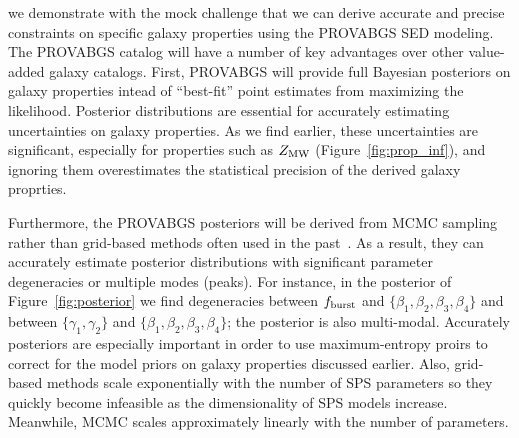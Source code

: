 
 we demonstrate with the mock challenge that we can derive
accurate and precise constraints on specific galaxy properties using the {\sc
PROVABGS} SED modeling. 
The {\sc PROVABGS} catalog will have a number of key advantages over other
value-added galaxy catalogs. 
First, {\sc PROVABGS} will provide full Bayesian posteriors on galaxy
properties intead of ``best-fit'' point estimates from maximizing the
likelihood. 
Posterior distributions are essential for accurately estimating uncertainties
on galaxy properties.  
As we find earlier, these uncertainties are significant, especially for
properties such as $Z_{\rm MW}$ (Figure~\ref{fig:prop_inf}), and ignoring them
overestimates the statistical precision of the derived galaxy proprties. 

Furthermore, the {\sc PROVABGS} posteriors will be derived from MCMC sampling
rather than grid-based methods often used in the
past~\citep[\emph{e.g.}][]{dacunha2008, moustakas2013, boquien2019}.
As a result, they can accurately estimate posterior distributions with
significant parameter degeneracies or multiple modes (peaks). 
For instance, in the posterior of Figure~\ref{fig:posterior} we find
degeneracies between $f_{\rm burst}$ and $\{\beta_1, \beta_2, \beta_3,
\beta_4\}$ and between $\{\gamma_1, \gamma_2\}$ and $\{\beta_1, \beta_2,
\beta_3, \beta_4\}$; the posterior is also multi-modal. 
Accurately posteriors are especially important in order to use maximum-entropy
proirs to correct for the model priors on galaxy properties discussed earlier. 
Also, grid-based methods scale exponentially with the number of SPS parameters
so they quickly become infeasible as the dimensionality of SPS models increase.  
Meanwhile, MCMC scales approximately linearly with the number of parameters. 

